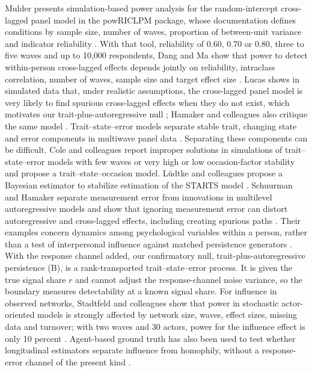 Mulder presents simulation-based power analysis for the random-intercept cross-lagged panel model in the powRICLPM package, whose documentation defines conditions by sample size, number of waves, proportion of between-unit variance and indicator reliability \cite{mulder2023}.
With that tool, reliability of 0.60, 0.70 or 0.80, three to five waves and up to 10,000 respondents, Dang and Ma show that power to detect within-person cross-lagged effects depends jointly on reliability, intraclass correlation, number of waves, sample size and target effect size \cite{dang2026}.
Lucas shows in simulated data that, under realistic assumptions, the cross-lagged panel model is very likely to find spurious cross-lagged effects when they do not exist, which motivates our trait-plus-autoregressive null \cite{lucas2023}; Hamaker and colleagues also critique the same model \cite{hamaker2015critique}.
Trait--state--error models separate stable trait, changing state and error components in multiwave panel data \cite{kenny1995tse}.
Separating these components can be difficult. Cole and colleagues report improper solutions in simulations of trait--state--error models with few waves or very high or low occasion-factor stability and propose a trait--state--occasion model. L\"udtke and colleagues propose a Bayesian estimator to stabilize estimation of the STARTS model \cite{cole2005tso,ludtke2018starts}.
Schuurman and Hamaker separate measurement error from innovations in multilevel autoregressive models and show that ignoring measurement error can distort autoregressive and cross-lagged effects, including creating spurious paths \cite{schuurman2019reliability}.
Their examples concern dynamics among psychological variables within a person, rather than a test of interpersonal influence against matched persistence generators \cite{schuurman2019reliability}.
With the response channel added, our confirmatory null, trait-plus-autoregressive persistence (B), is a rank-transported trait--state--error process. It is given the true signal share $r$ and cannot adjust the response-channel noise variance, so the boundary measures detectability at a known signal share.
For influence in observed networks, Stadtfeld and colleagues show that power in stochastic actor-oriented models is strongly affected by network size, waves, effect sizes, missing data and turnover; with two waves and 30 actors, power for the influence effect is only 10 percent \cite{stadtfeld2020}.
Agent-based ground truth has also been used to test whether longitudinal estimators separate influence from homophily, without a response-error channel of the present kind \cite{zachrison2016,daza2021}.
